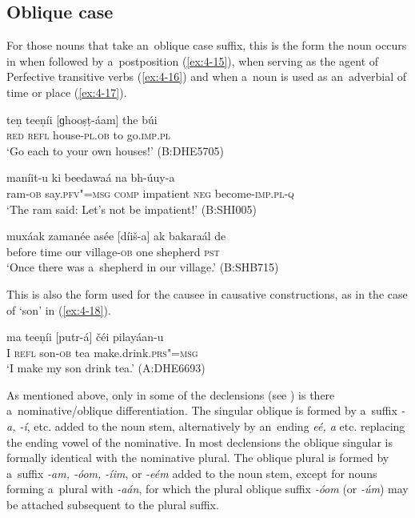 \subsection{Oblique case}
\label{subsec:4-5-2}

For those nouns that take an~oblique case suffix, this is the form the noun occurs in when followed by a~postposition (\ref{ex:4-15}), when serving as the agent of Perfective transitive verbs (\ref{ex:4-16}) and when a~noun is used as an~adverbial of time or place (\ref{ex:4-17}). 


\begin{exe}
\ex
\label{ex:4-15}
\gll teṇ teeṇíi [ɡhooṣṭ-áam] the búi\\
	\textsc{red} \textsc{refl} house-\textsc{pl.ob} to go.\textsc{imp.pl} \\
\glt `Go each to your own houses!' (B:DHE5705)
\end{exe}

\begin{exe}
\ex
\label{ex:4-16}
\gll [míḍ-a] maníit-u ki beedawaá na bh-úuy-a \\
	ram-\textsc{ob} say.\textsc{pfv"=msg} \textsc{comp} impatient \textsc{neg} become-\textsc{imp.pl-q} \\
\glt `The ram said: Let's not be impatient!' (B:SHI005)
\end{exe}

\begin{exe}
\ex
\label{ex:4-17}
\gll muxáak zamanée asée [díiš-a] ak bakaraál de \\
	before time our village-\textsc{ob} one shepherd \textsc{pst} \\
\glt `Once there was a~shepherd in our village.' (B:SHB715)
\end{exe}

This is also the form used for the causee in causative constructions, as in the case of `son' in (\ref{ex:4-18}). 


\begin{exe}
\ex
\label{ex:4-18}
\gll ma teeṇíi [putr-á] čéi pilayáan-u \\
	I \textsc{refl} son-\textsc{ob} tea make.drink.\textsc{prs"=msg} \\
\glt `I make my son drink tea.' (A:DHE6693)
\end{exe}

As mentioned above, only in some of the declensions (see ) is there a~nominative/oblique differentiation. The singular oblique is formed by a~suffix \textit{-a, -í}, etc. added to the noun stem, alternatively by an~ending \textit{eé, a} etc. replacing the ending vowel of the nominative. In most declensions the oblique singular is formally identical with the nominative plural. The oblique plural is formed by a~suffix \textit{-am, -óom, -íim}, or \textit{-eém} added to the noun stem, except for nouns forming a~plural with \textit{-aán}, for which the plural oblique suffix \textit{-óom} (or \textit{-úm}) may be attached subsequent to the plural suffix.

